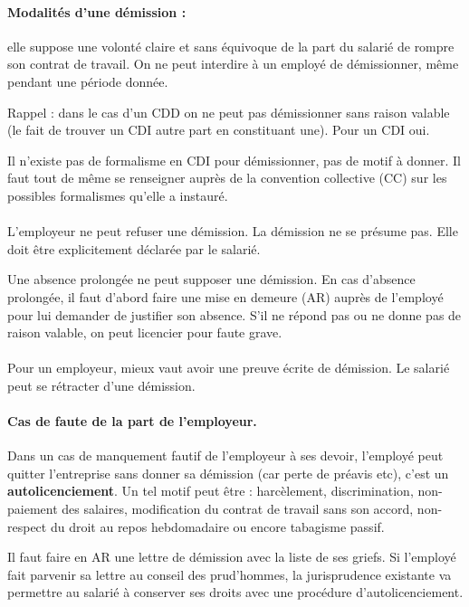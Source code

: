 \paragraph{Modalités d'une démission :} elle suppose une volonté claire et sans équivoque de la part du salarié de rompre son contrat de travail.
On ne peut interdire à un employé de démissionner, même pendant une période donnée.

Rappel : dans le cas d'un CDD on ne peut pas démissionner sans raison valable (le fait de trouver un CDI autre part en constituant une).
Pour un CDI oui.

Il n’existe pas de formalisme en CDI pour démissionner, pas de motif à donner.
Il faut tout de même se renseigner auprès de la convention collective (CC) sur les possibles formalismes qu’elle a instauré.

\paragraph{}
L’employeur ne peut refuser une démission.
La démission ne se présume pas.
Elle doit être explicitement déclarée par le salarié.

Une absence prolongée ne peut supposer une démission.
En cas d’absence prolongée, il faut d’abord faire une mise en demeure (AR) auprès de l’employé pour lui demander de justifier son absence.
S’il ne répond pas ou ne donne pas de raison valable, on peut licencier pour faute grave.

\paragraph{}
Pour un employeur, mieux vaut avoir une preuve écrite de démission.
Le salarié peut se rétracter d’une démission.

\paragraph{Cas de faute de la part de l'employeur.}
Dans un cas de manquement fautif de l'employeur à ses devoir, l'employé peut quitter l’entreprise sans donner sa démission (car perte de préavis etc), c'est un \textbf{autolicenciement}.
Un tel motif peut être : harcèlement, discrimination, non-paiement des salaires, modification du contrat de travail sans son accord, non-respect du droit au repos hebdomadaire ou encore tabagisme passif.

Il faut faire en AR une lettre de démission avec la liste de ses griefs.
Si l’employé fait parvenir sa lettre au conseil des prud’hommes, la jurisprudence existante va permettre au salarié à conserver ses droits avec une procédure d’autolicenciement.

